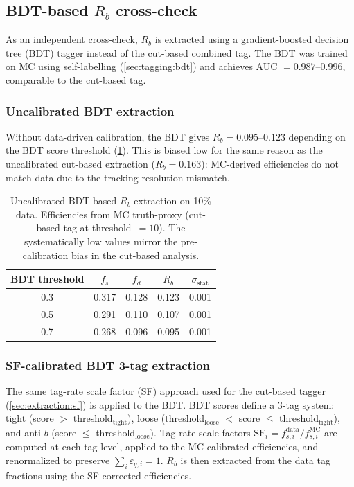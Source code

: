 \documentclass[11pt,a4paper]{article}
\begin{document}
\subsection{BDT-based $R_b$ cross-check}
\label{sec:crosscheck:bdt}

As an independent cross-check, $R_b$ is extracted using a
gradient-boosted decision tree (BDT) tagger instead of the
cut-based combined tag.
The BDT was trained on MC using self-labelling
(\cref{sec:tagging:bdt}) and achieves
AUC $= 0.987$--$0.996$, comparable to the cut-based tag.

\subsubsection{Uncalibrated BDT extraction}

Without data-driven calibration, the BDT gives $R_b = 0.095$--$0.123$
depending on the BDT score threshold (\cref{tbl:bdt_crosscheck_uncal}).
This is biased low for the same reason as the uncalibrated cut-based
extraction ($R_b = 0.163$): MC-derived efficiencies do not match data
due to the tracking resolution mismatch.

\begin{table}[htbp]
\centering
\caption{Uncalibrated BDT-based $R_b$ extraction on 10\% data.
Efficiencies from MC truth-proxy (cut-based tag at threshold~$=10$).
The systematically low values mirror the pre-calibration bias in
the cut-based analysis.}
\label{tbl:bdt_crosscheck_uncal}
\begin{tabular}{ccccc}
\toprule
BDT threshold & $f_s$ & $f_d$ & $R_b$ & $\sigma_\text{stat}$ \\
\midrule
0.3 & 0.317 & 0.128 & 0.123 & 0.001 \\
0.5 & 0.291 & 0.110 & 0.107 & 0.001 \\
0.7 & 0.268 & 0.096 & 0.095 & 0.001 \\
\bottomrule
\end{tabular}
\end{table}

\subsubsection{SF-calibrated BDT 3-tag extraction}

The same tag-rate scale factor (SF) approach used for the cut-based
tagger (\cref{sec:extraction:sf}) is applied to the BDT.
BDT scores define a 3-tag system: tight (score $>$ threshold$_\text{tight}$),
loose (threshold$_\text{loose}$ $<$ score $\leq$ threshold$_\text{tight}$),
and anti-$b$ (score $\leq$ threshold$_\text{loose}$).
Tag-rate scale factors $\text{SF}_i = f_{s,i}^\text{data} / f_{s,i}^\text{MC}$
are computed at each tag level, applied to the MC-calibrated efficiencies,
and renormalized to preserve $\sum_i \varepsilon_{q,i} = 1$.
$R_b$ is then extracted from the data tag fractions using the
SF-corrected efficiencies.
\end{document}
